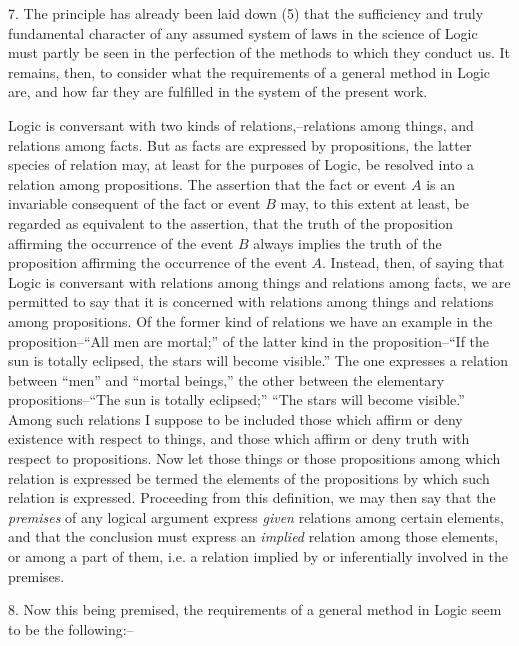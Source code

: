 \documentclass[oneside]{book}
\begin{document}
7. The principle has already been laid down (5) that the
sufficiency and truly fundamental character of any assumed system
of laws in the science of Logic must partly be seen in the
perfection of the methods to which they conduct us. It remains,
then, to consider what the requirements of a general method in
Logic are, and how far they are fulfilled in the system of the present
work.

Logic is conversant with two kinds of relations,--relations
among things, and relations among facts. But as facts are expressed
by propositions, the latter species of relation may, at
least for the purposes of Logic, be resolved into a relation among
propositions. The assertion that the fact or event $A$ is an invariable
consequent of the fact or event $B$ may, to this extent at
least, be regarded as equivalent to the assertion, that the truth
of the proposition affirming the occurrence of the event $B$ always
implies the truth of the proposition affirming the occurrence of
the event $A$. Instead, then, of saying that Logic is conversant
with relations among things and relations among facts, we are
permitted to say that it is concerned with relations among things
and relations among propositions. Of the former kind of relations
we have an example in the proposition--``All men are mortal;''
of the latter kind in the proposition--``If the sun is totally
eclipsed, the stars will become visible.'' The one expresses a relation
between ``men'' and ``mortal beings,'' the other between
the elementary propositions--``The sun is totally eclipsed;''
``The stars will become visible.'' Among such relations I suppose
to be included those which affirm or deny existence with
respect to things, and those which affirm or deny truth with respect
to propositions. Now let those things or those propositions
among which relation is expressed be termed the elements of
the propositions by which such relation is expressed. Proceeding
from this definition, we may then say that the \textit{premises} of any
logical argument express \textit{given} relations among certain elements,
and that the conclusion must express an \textit{implied} relation among
those elements, or among a part of them, i.e. a relation implied
by or inferentially involved in the premises.

8. Now this being premised, the requirements of a general
method in Logic seem to be the following:--
\end{document}
